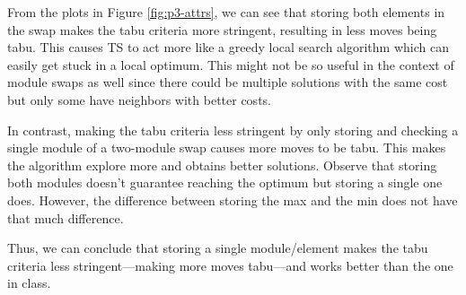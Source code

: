 From the plots in Figure \ref{fig:p3-attrs}, we can see that storing both elements in the swap makes the tabu criteria more stringent, resulting in less moves being tabu. This causes TS to act more like a greedy local search algorithm which can easily get stuck in a local optimum. This might not be so useful in the context of module swaps as well since there could be multiple solutions with the same cost but only some have neighbors with better costs.

In contrast, making the tabu criteria less stringent by only storing and checking a single module of a two-module swap causes more moves to be tabu. This makes the algorithm explore more and obtains better solutions. Observe that storing both modules doesn't guarantee reaching the optimum but storing a single one does. However, the difference between storing the max and the min does not have that much difference.

Thus, we can conclude that storing a single module/element makes the tabu criteria less stringent---making more moves tabu---and works better than the one in class.
